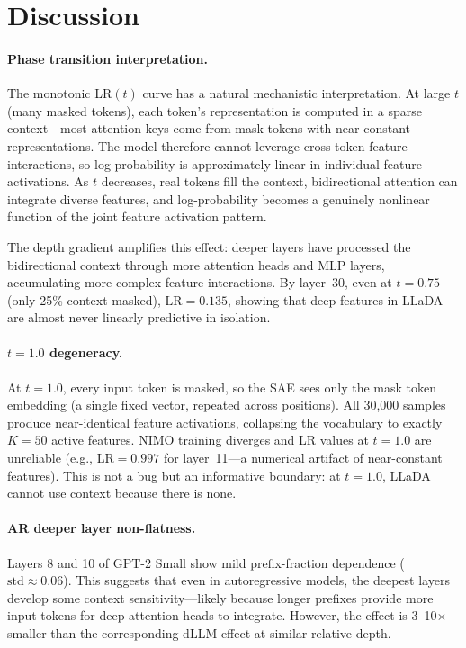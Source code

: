 \documentclass[11pt]{article}
\newcommand{\LR}{\mathrm{LR}}
\begin{document}
\section{Discussion}

\paragraph{Phase transition interpretation.}
The monotonic LR$(t)$ curve has a natural mechanistic interpretation. At large $t$ (many masked tokens), each token's representation is computed in a sparse context---most attention keys come from mask tokens with near-constant representations. The model therefore cannot leverage cross-token feature interactions, so log-probability is approximately linear in individual feature activations. As $t$ decreases, real tokens fill the context, bidirectional attention can integrate diverse features, and log-probability becomes a genuinely nonlinear function of the joint feature activation pattern.

The depth gradient amplifies this effect: deeper layers have processed the bidirectional context through more attention heads and MLP layers, accumulating more complex feature interactions. By layer~30, even at $t = 0.75$ (only 25\% context masked), $\LR = 0.135$, showing that deep features in LLaDA are almost never linearly predictive in isolation.

\paragraph{$t = 1.0$ degeneracy.}
At $t = 1.0$, every input token is masked, so the SAE sees only the mask token embedding (a single fixed vector, repeated across positions). All 30,000 samples produce near-identical feature activations, collapsing the vocabulary to exactly $K = 50$ active features. NIMO training diverges and LR values at $t = 1.0$ are unreliable (e.g., $\LR = 0.997$ for layer~11---a numerical artifact of near-constant features). This is not a bug but an informative boundary: at $t = 1.0$, LLaDA cannot use context because there is none.

\paragraph{AR deeper layer non-flatness.}
Layers 8 and 10 of GPT-2 Small show mild prefix-fraction dependence ($\mathrm{std} \approx 0.06$). This suggests that even in autoregressive models, the deepest layers develop some context sensitivity---likely because longer prefixes provide more input tokens for deep attention heads to integrate. However, the effect is 3--10$\times$ smaller than the corresponding dLLM effect at similar relative depth.
\end{document}

